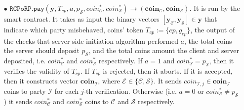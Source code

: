\begin{definition}
\begin{itemize}

\
	
	
\item[$\bullet$] $\mathtt{RCPoRP}.\mathtt{pay}(\bm{y},T_{\scriptscriptstyle cp},a,p_{\scriptscriptstyle\mathcal S}, coin^{\scriptscriptstyle *}_{\scriptscriptstyle\mathcal C},coin^{\scriptscriptstyle *}_{\scriptscriptstyle\mathcal S})\rightarrow ({\bm{coin}}_{\scriptscriptstyle\mathcal C},{\bm{coin}}_{\scriptscriptstyle\mathcal S})$. It is run by the smart contract. It takes as input the binary vectors $[\bm{y}_{\scriptscriptstyle \mathcal  C}, \bm{y}_{\scriptscriptstyle \mathcal  S}]\in \bm{y}$ that indicate which party misbehaved,  coins' token $T_{\scriptscriptstyle cp}:=\{cp,g_{\scriptscriptstyle cp}\}$, the output of the checks that server-side initiation algorithm  performed $a$, the total coins the server should deposit $p_{\scriptscriptstyle\mathcal S}$, and the total coins amount the client and server  deposited, i.e. $coin^{\scriptscriptstyle *}_{\scriptscriptstyle\mathcal C}$ and $coin^{\scriptscriptstyle *}_{\scriptscriptstyle\mathcal S}$ respectively. If $a=1$ and  $coin^{\scriptscriptstyle *}_{\scriptscriptstyle\mathcal S}= p_{\scriptscriptstyle\mathcal S}$, then it verifies the validity of $T_{\scriptscriptstyle cp}$. If $T_{\scriptscriptstyle cp}$ is rejected, then it aborts. 
If it is accepted, then it constructs  vector ${\bm{coin}}_{\scriptscriptstyle\mathcal I}$, where $\mathcal{E}\in\{\mathcal{C},\mathcal{S}\}$. It sends ${{coin}}_{\scriptscriptstyle\mathcal{I},j}\in{\bm{coin}}_{\scriptscriptstyle\mathcal I}$ coins to party $\mathcal{I}$ for each $j$-th verification. Otherwise (i.e. $a=0$ or $coin^{\scriptscriptstyle *}_{\scriptscriptstyle\mathcal S}\neq p_{\scriptscriptstyle\mathcal S}$)  it  sends $coin^{\scriptscriptstyle *}_{\scriptscriptstyle\mathcal C}$ and $coin^{\scriptscriptstyle *}_{\scriptscriptstyle\mathcal S}$ coins to $\mathcal C$ and $\mathcal S$ respectively. 	
	

\end{itemize}
\end{definition}
